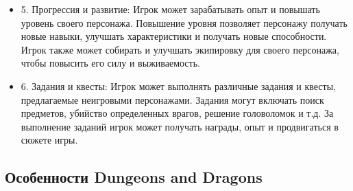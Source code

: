 \begin{itemize}
\begin{itemize}
 		\item 5. Прогрессия и развитие: Игрок может зарабатывать опыт и повышать уровень своего персонажа. Повышение уровня позволяет персонажу получать новые навыки, улучшать характеристики и получать новые способности. Игрок также может собирать и улучшать экипировку для своего персонажа, чтобы повысить его силу и выживаемость.
 		\item 6. Задания и квесты: Игрок может выполнять различные задания и квесты, предлагаемые неигровыми персонажами. Задания могут включать поиск предметов, убийство определенных врагов, решение головоломок и т.д. За выполнение заданий игрок может получать награды, опыт и продвигаться в сюжете игры.
 	\end{itemize}
 \end{itemize}
 
\subsection{Особенности Dungeons and Dragons}
